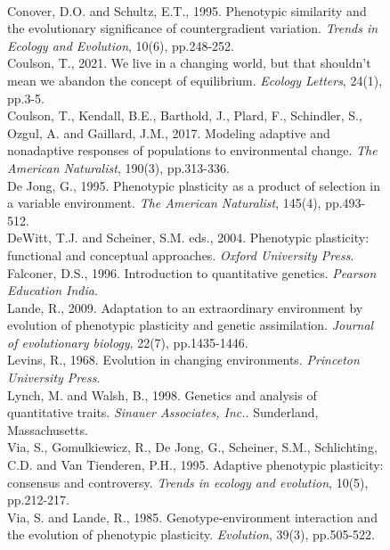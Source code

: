 \documentclass[11pt, oneside]{amsart}
\begin{document}
\renewcommand\thefigure{: Literature Cited}
\begin{figure}[h]
\begin{center}
\end{center}
\label{Fig: Literature Cited}
\caption[Literature Cited]{
\\
Conover, D.O. and Schultz, E.T., 1995. Phenotypic similarity and the evolutionary significance of countergradient variation. \emph{Trends in Ecology and Evolution}, 10(6), pp.248-252.\\ 

Coulson, T., 2021. We live in a changing world, but that shouldn’t mean we abandon the concept of equilibrium. \emph{Ecology Letters}, 24(1), pp.3-5.\\

Coulson, T., Kendall, B.E., Barthold, J., Plard, F., Schindler, S., Ozgul, A. and Gaillard, J.M., 2017. Modeling adaptive and nonadaptive responses of populations to environmental change. \emph{The American Naturalist}, 190(3), pp.313-336.\\

De Jong, G., 1995. Phenotypic plasticity as a product of selection in a variable environment. \emph{The American Naturalist}, 145(4), pp.493-512.\\

DeWitt, T.J. and Scheiner, S.M. eds., 2004. Phenotypic plasticity: functional and conceptual approaches. \emph{Oxford University Press}.\\

Falconer, D.S., 1996. Introduction to quantitative genetics. \emph{Pearson Education India}.\\

Lande, R., 2009. Adaptation to an extraordinary environment by evolution of phenotypic plasticity and genetic assimilation. \emph{Journal of evolutionary biology}, 22(7), pp.1435-1446.\\

Levins, R., 1968. Evolution in changing environments. \emph{Princeton University Press}.\\

Lynch, M. and Walsh, B., 1998. Genetics and analysis of quantitative traits. \emph{Sinauer Associates, Inc.}. Sunderland, Massachusetts.\\

Via, S., Gomulkiewicz, R., De Jong, G., Scheiner, S.M., Schlichting, C.D. and Van Tienderen, P.H., 1995. Adaptive phenotypic plasticity: consensus and controversy. \emph{Trends in ecology and evolution}, 10(5), pp.212-217.\\

Via, S. and Lande, R., 1985. Genotype‐environment interaction and the evolution of phenotypic plasticity. \emph{Evolution}, 39(3), pp.505-522.\\
}

\end{figure}

\clearpage
\newpage
\end{document}
